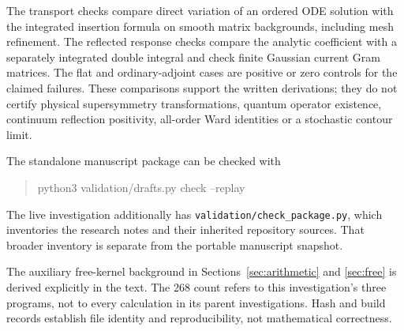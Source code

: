 The transport checks compare direct variation of an ordered ODE
solution with the integrated insertion formula on smooth matrix
backgrounds, including mesh refinement. The reflected response
checks compare the analytic coefficient with a separately integrated
double integral and check finite Gaussian current Gram matrices.
The flat and ordinary-adjoint cases are positive or zero controls
for the claimed failures. These comparisons support the written
derivations; they do not certify physical supersymmetry transformations,
quantum operator existence, continuum reflection positivity,
all-order Ward identities or a stochastic contour limit.

The standalone manuscript package can be checked with
\begin{quote}\ttfamily\small
python3 validation/drafts.py check --replay
\end{quote}
The live investigation additionally has
\nolinkurl{validation/check_package.py}, which inventories the
research notes and their inherited repository sources. That broader
inventory is separate from the portable manuscript snapshot.

The auxiliary free-kernel background in Sections~\ref{sec:arithmetic}
and \ref{sec:free} is derived explicitly in the text. The 268 count
refers to this investigation's three programs, not to every calculation
in its parent investigations. Hash and build records establish file
identity and reproducibility, not mathematical correctness.
